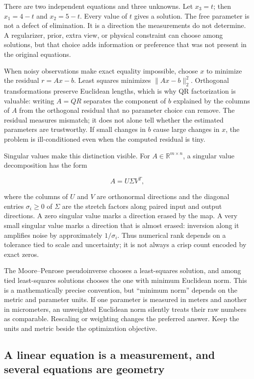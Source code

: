 There are two independent equations and three unknowns. Let \(x_3=t\); then \(x_1=4-t\) and \(x_2=5-t\). Every value of \(t\) gives a solution. The free parameter is not a defect of elimination. It is a direction the measurements do not determine. A regularizer, prior, extra view, or physical constraint can choose among solutions, but that choice adds information or preference that was not present in the original equations.

When noisy observations make exact equality impossible, choose \(x\) to minimize the residual \(r=Ax-b\). Least squares minimizes \(\|Ax-b\|_2^2\). Orthogonal transformations preserve Euclidean lengths, which is why QR factorization is valuable: writing \(A=QR\) separates the component of \(b\) explained by the columns of \(A\) from the orthogonal residual that no parameter choice can remove. The residual measures mismatch; it does not alone tell whether the estimated parameters are trustworthy. If small changes in \(b\) cause large changes in \(x\), the problem is ill-conditioned even when the computed residual is tiny.

Singular values make this distinction visible. For \(A\in\mathbb R^{m\times n}\), a singular value decomposition has the form

\[
A=U\Sigma V^T,
\]

where the columns of \(U\) and \(V\) are orthonormal directions and the diagonal entries \(\sigma_i\ge 0\) of \(\Sigma\) are the stretch factors along paired input and output directions. A zero singular value marks a direction erased by the map. A very small singular value marks a direction that is almost erased: inversion along it amplifies noise by approximately \(1/\sigma_i\). Thus numerical rank depends on a tolerance tied to scale and uncertainty; it is not always a crisp count encoded by exact zeros.

The Moore--Penrose pseudoinverse chooses a least-squares solution, and among tied least-squares solutions chooses the one with minimum Euclidean norm. This is a mathematically precise convention, but ``minimum norm'' depends on the metric and parameter units. If one parameter is measured in meters and another in micrometers, an unweighted Euclidean norm silently treats their raw numbers as comparable. Rescaling or weighting changes the preferred answer. Keep the units and metric beside the optimization objective.

\subsection{A linear equation is a measurement, and several equations are geometry}\label{a-linear-equation-is-a-measurement-and-several-equations-are-geometry}

